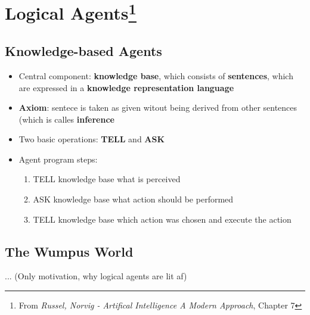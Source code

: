 \documentclass{scrartcl}
\begin{document}
\section[title]{Logical Agents\footnote{From \textit{Russel, Norvig - Artifical Intelligence A Modern Approach}, Chapter 7}}
\subsection{Knowledge-based Agents}
\begin{itemize}
    \item
        Central component: \textbf{knowledge base}, which consists of \textbf{sentences}, which are expressed in a \textbf{knowledge representation language}
    \item
        \textbf{Axiom}: sentece is taken as given witout being derived from other sentences (which is calles \textbf{inference}
    \item
        Two basic operations: \textbf{TELL} and \textbf{ASK} 
    \item
        Agent program steps:
    \begin{enumerate}
        \item
            TELL knowledge base what is perceived
        \item
            ASK knowledge base what action should be performed
        \item
            TELL knowledge base which action was chosen and execute the action 
    \end{enumerate}
\end{itemize}

\subsection{The Wumpus World}
... (Only motivation, why logical agents are lit af)
\end{document}
